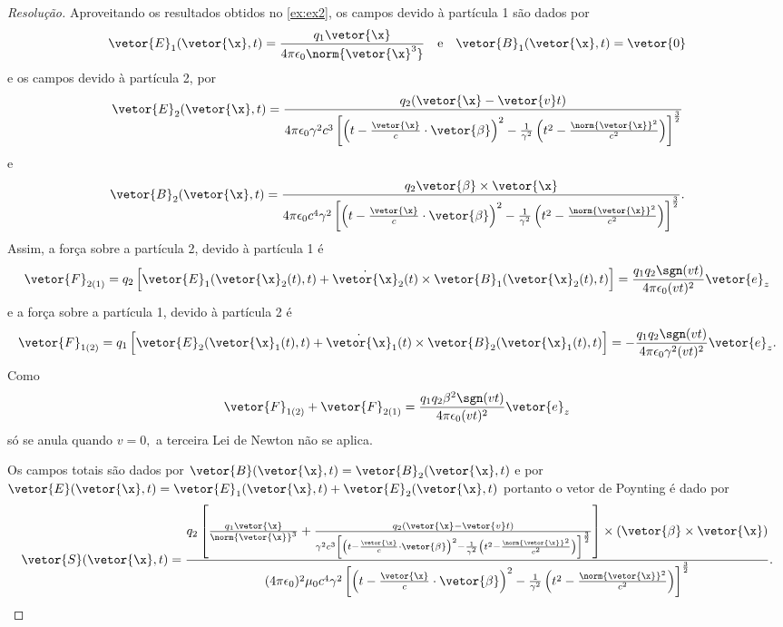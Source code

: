 \begin{proof}[Resolução]
   Aproveitando os resultados obtidos no \cref{ex:ex2}, os campos devido à partícula 1 são dados por
   \begin{equation*}
      \vetor{E}_1(\vetor{\x}, t) = \frac{q_1 \vetor{\x}}{4\pi \epsilon_0 \norm{\vetor{\x}^3}} 
      \quad\text{e}\quad
      \vetor{B}_1(\vetor{\x}, t) = \vetor{0}
   \end{equation*}
   e os campos devido à partícula 2, por
   \begin{equation*}
      \vetor{E}_2(\vetor{\x},t) = \frac{q_2 (\vetor{\x} - \vetor{v}t)}{4\pi \epsilon_0\gamma^2c^3 \left[\left(t - \frac{\vetor{\x}}{c} \cdot \vetor{\beta}\right)^2 - \frac1{\gamma^2} \left(t^2 - \frac{\norm{\vetor{\x}}^2}{c^2}\right)\right]^{\frac32}}
   \end{equation*}
   e
   \begin{equation*}
      \vetor{B}_2(\vetor{\x}, t) = \frac{q_2 \vetor{\beta} \times \vetor{\x}}{4\pi \epsilon_0 c^4 \gamma^2 \left[\left(t - \frac{\vetor{\x}}{c} \cdot \vetor{\beta}\right)^2 - \frac{1}{\gamma^2} \left(t^2 - \frac{\norm{\vetor{\x}}^2}{c^2}\right)\right]^{\frac32}}.
   \end{equation*}
   Assim, a força sobre a partícula 2, devido à partícula 1 é
   \begin{equation*}
      \vetor{F}_{2(1)} = q_2 \left[\vetor{E}_1(\vetor{\x}_2(t), t) + \dot{\vetor{\x}}_2(t) \times \vetor{B}_1(\vetor{\x}_2(t), t)\right] = \frac{q_1 q_2 \sgn(v t)}{4\pi \epsilon_0 (vt)^2}\vetor{e}_z
   \end{equation*}
   e a força sobre a partícula 1, devido à partícula 2 é
   \begin{equation*}
      \vetor{F}_{1(2)} = q_1 \left[\vetor{E}_2(\vetor{\x}_1(t), t) + \dot{\vetor{\x}}_1(t) \times \vetor{B}_2(\vetor{\x}_1(t), t)\right] = -\frac{q_1 q_2\sgn(vt)}{4\pi \epsilon_0 \gamma^2 (v t)^2} \vetor{e}_z.
   \end{equation*}
   Como
   \begin{equation*}
      \vetor{F}_{1(2)} + \vetor{F}_{2(1)} = \frac{q_1 q_2 \beta^2\sgn(vt)}{4 \pi \epsilon_0 (vt)^2}\vetor{e}_z
   \end{equation*}
   só se anula quando \(v = 0,\) a terceira Lei de Newton não se aplica.

   Os campos totais são dados por \(\vetor{B}(\vetor{\x}, t) = \vetor{B}_2(\vetor{\x}, t)\) e por \(\vetor{E}(\vetor{\x},t) = \vetor{E}_1(\vetor{\x}, t) + \vetor{E}_2(\vetor{\x}, t)\) portanto o vetor de Poynting é dado por
   \begin{equation*}
      \vetor{S}(\vetor{\x}, t) 
      = \frac{q_2\left[\frac{q_1\vetor{\x} }{\norm{\vetor{\x}}^3} + \frac{q_2(\vetor{\x} - \vetor{v}t) }{\gamma^2 c^3 \left[\left(t - \frac{\vetor{\x}}{c} \cdot \vetor{\beta}\right)^2 - \frac{1}{\gamma^2} \left(t^2 - \frac{\norm{\vetor{\x}}^2}{c^2}\right)\right]^{\frac32}}\right]\times (\vetor{\beta} \times \vetor{\x})}{(4\pi \epsilon_0)^2 \mu_0 c^4 \gamma^2 \left[\left(t - \frac{\vetor{\x}}{c} \cdot \vetor{\beta}\right)^2 - \frac{1}{\gamma^2} \left(t^2 - \frac{\norm{\vetor{\x}}^2}{c^2}\right)\right]^{\frac32}}.
   \end{equation*}


\end{proof}
